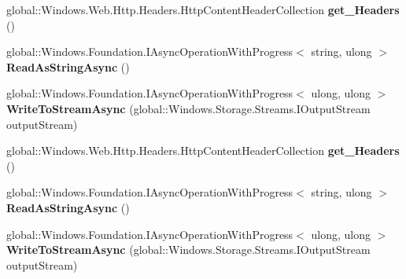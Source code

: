 \begin{DoxyCompactItemize}
\item 
\mbox{\label{interface_windows_1_1_web_1_1_http_1_1_i_http_content_ae0cb5f56b7f9992187205375002cb2e8}} 
global\+::\+Windows.\+Web.\+Http.\+Headers.\+Http\+Content\+Header\+Collection {\bfseries get\+\_\+\+Headers} ()
\item 
\mbox{\label{interface_windows_1_1_web_1_1_http_1_1_i_http_content_aef4019ba8a9cebd9b1025bb90c9b27c2}} 
global\+::\+Windows.\+Foundation.\+I\+Async\+Operation\+With\+Progress$<$ string, ulong $>$ {\bfseries Read\+As\+String\+Async} ()
\item 
\mbox{\label{interface_windows_1_1_web_1_1_http_1_1_i_http_content_afe0268dc0fae8ae3351e2e463f08e7f2}} 
global\+::\+Windows.\+Foundation.\+I\+Async\+Operation\+With\+Progress$<$ ulong, ulong $>$ {\bfseries Write\+To\+Stream\+Async} (global\+::\+Windows.\+Storage.\+Streams.\+I\+Output\+Stream output\+Stream)
\item 
\mbox{\label{interface_windows_1_1_web_1_1_http_1_1_i_http_content_ae0cb5f56b7f9992187205375002cb2e8}} 
global\+::\+Windows.\+Web.\+Http.\+Headers.\+Http\+Content\+Header\+Collection {\bfseries get\+\_\+\+Headers} ()
\item 
\mbox{\label{interface_windows_1_1_web_1_1_http_1_1_i_http_content_aef4019ba8a9cebd9b1025bb90c9b27c2}} 
global\+::\+Windows.\+Foundation.\+I\+Async\+Operation\+With\+Progress$<$ string, ulong $>$ {\bfseries Read\+As\+String\+Async} ()
\item 
\mbox{\label{interface_windows_1_1_web_1_1_http_1_1_i_http_content_afe0268dc0fae8ae3351e2e463f08e7f2}} 
global\+::\+Windows.\+Foundation.\+I\+Async\+Operation\+With\+Progress$<$ ulong, ulong $>$ {\bfseries Write\+To\+Stream\+Async} (global\+::\+Windows.\+Storage.\+Streams.\+I\+Output\+Stream output\+Stream)
\item 
\mbox{\label{interface_windows_1_1_web_1_1_http_1_1_i_http_content_ae0cb5f56b7f9992187205375002cb2e8}} 

\end{DoxyCompactItemize}
